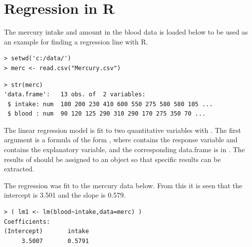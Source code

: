 \documentclass[10pt,openany]{book}\usepackage[]{graphicx}\usepackage[]{color}
\makeatletter
\newenvironment{kframe}{%
 \def\at@end@of@kframe{}%
 \ifinner\ifhmode%
  \def\at@end@of@kframe{\end{minipage}}%
  \begin{minipage}{\columnwidth}%
 \fi\fi%
 \def\FrameCommand##1{\hskip\@totalleftmargin \hskip-\fboxsep
 \colorbox{shadecolor}{##1}\hskip-\fboxsep
     \hskip-\linewidth \hskip-\@totalleftmargin \hskip\columnwidth}%
 \MakeFramed {\advance\hsize-\width
   \@totalleftmargin\z@ \linewidth\hsize
   \@setminipage}}%
 {\par\unskip\endMakeFramed%
 \at@end@of@kframe}
\newenvironment{knitrout}{}{} %
\makeatother
\begin{document}
\section{Regression in R}
The mercury intake and amount in the blood data is loaded below to be used as an example for finding a regression line with R.
\begin{knitrout}
\color{fgcolor}\begin{kframe}
\begin{verbatim}
> setwd('c:/data/')
> merc <- read.csv("Mercury.csv")
\end{verbatim}
\end{kframe}
\end{knitrout}
\vspace{-14pt}
\begin{knitrout}
\color{fgcolor}\begin{kframe}
\begin{verbatim}
> str(merc)
'data.frame':	13 obs. of  2 variables:
 $ intake: num  180 200 230 410 600 550 275 580 580 105 ...
 $ blood : num  90 120 125 290 310 290 170 275 350 70 ...
\end{verbatim}
\end{kframe}
\end{knitrout}

The linear regression model is fit to two quantitative variables with . The first argument is a formula of the form , where  contains the response variable and  contains the explanatory variable, and the corresponding data.frame is in . The results of  should be assigned to an object so that specific results can be extracted.



The regression was fit to the mercury data below. From this it is seen that the intercept is 3.501 and the slope is 0.579.
\begin{knitrout}
\color{fgcolor}\begin{kframe}
\begin{verbatim}
> ( lm1 <- lm(blood~intake,data=merc) )
Coefficients:
(Intercept)       intake  
     3.5007       0.5791  
\end{verbatim}
\end{kframe}
\end{knitrout}
\end{document}

